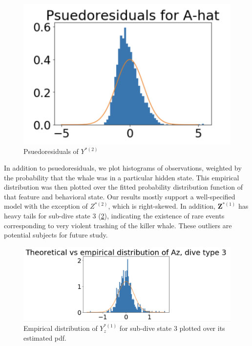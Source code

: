 \begin{figure}[ht]
	\centering
	\includegraphics[width=5in]{../Plots/pseudoresids.png}
	\caption{Psuedoresiduals of $Y^{*(2)}$}
	\label{fig:pseudoresids}
\end{figure}

In addition to psuedoresiduals, we plot histograms of observations, weighted by the probability that the whale was in a particular hidden state. This empirical distribution was then plotted over the fitted probability distribution function of that feature and behavioral state. Our results mostly support a well-specified model with the exception of $Z^{*(2)}$, which is right-skewed. In addition, $\mathbf{Z}^{*(1)}$ has heavy tails for sub-dive state 3 (\ref{fig:empirical_dist}), indicating the existence of rare events corresponding to very violent trashing of the killer whale. These outliers are potential subjects for future study.

\begin{figure}[ht]
	\centering
	\includegraphics[width=5in]{../Plots/empirical_dist.png}
	\caption{Empirical distribution of $Y^{*(1)}_z$ for sub-dive state 3 plotted over its estimated pdf.}
	\label{fig:empirical_dist}
\end{figure}
